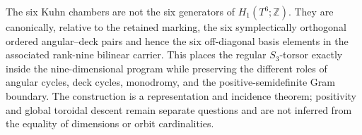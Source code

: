 \begin{auditrecord}
The six Kuhn chambers are not the six generators of
\(H_1(T^6;\mathbb Z)\).  They are canonically, relative to the retained
marking, the six symplectically orthogonal ordered angular--deck pairs and
hence the six off-diagonal basis elements in the associated rank-nine
bilinear carrier.  This places the regular \(S_3\)-torsor exactly inside the
nine-dimensional program while preserving the different roles of angular
cycles, deck cycles, monodromy, and the positive-semidefinite Gram boundary.
The construction is a representation and incidence theorem; positivity and
global toroidal descent remain separate questions and are not inferred from
the equality of dimensions or orbit cardinalities.
\end{auditrecord}
